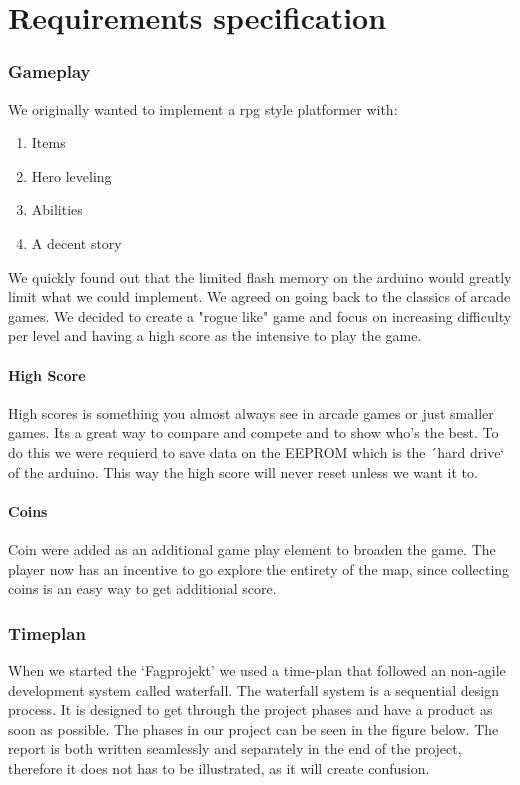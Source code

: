 \chapter{Requirements specification}

\subsection{Gameplay}%
We originally wanted to implement a rpg style platformer with:
\begin{enumerate}
\item Items
\item Hero leveling
\item Abilities
\item A decent story
\end{enumerate}
We quickly found out that the limited flash memory on the arduino would greatly limit what we could implement. We agreed on going back to the classics of arcade games. We decided to create a "rogue like" game and focus on increasing difficulty per level and having a high score as the intensive to play the game.

\subsubsection{High Score}
High scores is something you almost always see in arcade games or just smaller games. Its a great way to compare and compete and to show who's the best. 
To do this we were requierd to save data on the EEPROM which is the ´hard drive` of the arduino. This way the high score will never reset unless we want it to.

\subsubsection{Coins}
Coin were added as an additional game play element to broaden the game. The player now has an incentive to go explore the entirety of the map, since collecting coins is an easy way to get additional score.


\subsection{Timeplan} %
When we started the `Fagprojekt' we used a time-plan that followed an non-agile development
system called waterfall. The waterfall system is a sequential design process.
It is designed to get through the project phases and have a product as soon as
possible. The phases in our project can be seen in the figure below.
The report is both written seamlessly and separately in the end of the project,
therefore it does not has to be illustrated, as it will create confusion.


